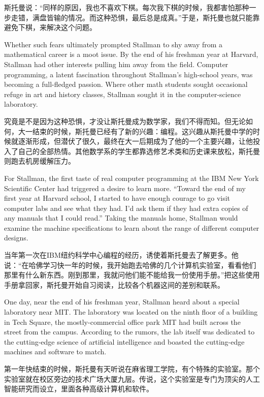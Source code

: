 \ifdefined\chs
斯托曼说：``同样的原因，我也不喜欢下棋。每次我下棋的时候，我都害怕那种一步走错，满盘皆输的情况。而这种恐惧，最后总是成真。''于是，斯托曼也就只能靠避免下棋，来解决这个问题。
\fi

\ifdefined\eng
Whether such fears ultimately prompted Stallman to shy away from a mathematical career is a moot issue. By the end of his freshman year at Harvard, Stallman had other interests pulling him away from the field. Computer programming, a latent fascination throughout Stallman's high-school years, was becoming a full-fledged passion. Where other math students sought occasional refuge in art and history classes, Stallman sought it in the computer-science laboratory.
\fi

\ifdefined\chs
究竟是不是因为这种恐惧，才没让斯托曼成为数学家，我们不得而知。但无论如何，大一结束的时候，斯托曼已经有了新的兴趣：编程。这兴趣从斯托曼中学的时候就逐渐形成，但潜伏了很久，最终在大一后期成为了他的一个主要兴趣，让他投入了自己的全部热情。其他数学系的学生都靠选修艺术类和历史课来放松，斯托曼则跑去机房缓解压力。
\fi

\ifdefined\eng
For Stallman, the first taste of real computer programming at the IBM New York Scientific Center had triggered a desire to learn more. ``Toward the end of my first year at Harvard school, I started to have enough courage to go visit computer labs and see what they had. I'd ask them if they had extra copies of any manuals that I could read.'' Taking the manuals home, Stallman would examine the machine specifications to learn about the range of different computer designs.
\fi

\ifdefined\chs
当年第一次在IBM纽约科学中心编程的经历，诱使着斯托曼去了解更多。他说：``在哈佛学习快一年的时候，我开始跑去哈佛的几个计算机实验室，看看他们那里有什么新东西。刚到那里，我就问他们能不能给我一份使用手册。''把这些使用手册拿回家，斯托曼开始自习阅读，比较各个机器这间的差别和联系。
\fi

\ifdefined\eng
One day, near the end of his freshman year, Stallman heard about a special laboratory near MIT. The laboratory was located on the ninth floor of a building in Tech Square, the mostly-commercial office park MIT had built across the street from the campus. According to the rumors, the lab itself was dedicated to the cutting-edge science of artificial intelligence and boasted the cutting-edge machines and software to match.
\fi

\ifdefined\chs
第一年快结束的时候，斯托曼有天听说在麻省理工学院，有个特殊的实验室。那个实验室就在校区旁边的技术广场大厦九层。传说，这个实验室是专门为顶尖的人工智能研究而设立，里面各种高级计算机和软件。
\fi

